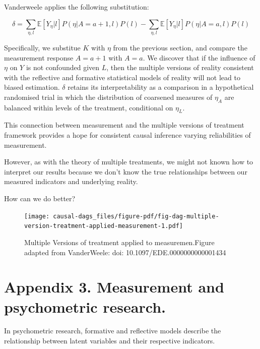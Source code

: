 \documentclass[
  singlecolumn]{report}
\begin{document}
Vanderweele applies the following substitution:

\[\delta = \sum_{\eta,l} \mathbb{E}[Y_\eta|l] P(\eta|A=a+1,l) P(l) - \sum_{\eta,l} \mathbb{E}[Y_\eta|l] P(\eta|A=a,l) P(l)\]

Specifically, we substitue \(K\) with \(\eta\) from the previous
section, and compare the measurement response \(A = a + 1\) with
\(A = a\). We discover that if the influence of \(\eta\) on \(Y\) is not
confounded given \(L\), then the multiple versions of reality consistent
with the reflective and formative statistical models of reality will not
lead to biased estimation. \(\delta\) retains its interpretability as a
comparison in a hypothetical randomised trial in which the distribution
of coarsened measures of \(\eta_A\) are balanced within levels of the
treatment, conditional on \(\eta_L\).

This connection between measurement and the multiple versions of
treatment framework provides a hope for consistent causal inference
varying reliabilities of measurement.

However, as with the theory of multiple treatments, we might not known
how to interpret our results because we don't know the true
relationships between our measured indicators and underlying reality.

How can we do better?

\begin{figure}

{\centering \texttt{[image: causal-dags\_files/figure-pdf/fig-dag-multiple-version-treatment-applied-measurement-1.pdf]}

}

\caption{\label{fig-dag-multiple-version-treatment-applied-measurement}Multiple
Versions of treatment applied to measuremen.Figure adapted from
VanderWeele: doi: 10.1097/EDE.0000000000001434}

\end{figure}

\hypertarget{appendix-3.-measurement-and-psychometric-research.}{%
\section{Appendix 3. Measurement and psychometric
research.}\label{appendix-3.-measurement-and-psychometric-research.}}

In psychometric research, formative and reflective models describe the
relationship between latent variables and their respective indicators.
\end{document}
